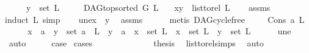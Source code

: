 \begin{isabellebody}
\ \ \ \ \ {\isachardoublequoteopen}y\ {\isasymin}\ set\ L{\isachardoublequoteclose}\isanewline
\ \ \ \ \ {\isachardoublequoteopen}DAG{\isachardot}{\kern0pt}top{\isacharunderscore}{\kern0pt}sorted\ G\ L{\isachardoublequoteclose}\isanewline
\ \ \ {\isachardoublequoteopen}{\isacharparenleft}{\kern0pt}x{\isacharcomma}{\kern0pt}y{\isacharparenright}{\kern0pt}\ {\isasymin}\ list{\isacharunderscore}{\kern0pt}to{\isacharunderscore}{\kern0pt}rel\ L{\isachardoublequoteclose}\isanewline
%
\isadelimproof
\ \ %
\endisadelimproof
%
\isatagproof
{}\isamarkupfalse%
\ assms\isanewline
{}\isamarkupfalse%
{\isacharparenleft}{\kern0pt}induct\ L{\isacharcomma}{\kern0pt}\ simp{\isacharparenright}{\kern0pt}\isanewline
\ \ \isamarkupfalse%
\ une{\isacharcolon}{\kern0pt}{\isachardoublequoteopen}x\ {\isasymnoteq}\ y{\isachardoublequoteclose}\ \isamarkupfalse%
\ assms\isanewline
\ \ \ \ \isamarkupfalse%
\ {\isacharparenleft}{\kern0pt}metis\ DAG{\isachardot}{\kern0pt}cycle{\isacharunderscore}{\kern0pt}free{\isacharparenright}{\kern0pt}\ \isanewline
\ \ \isamarkupfalse%
\ {\isacharparenleft}{\kern0pt}Cons\ a\ L{\isacharparenright}{\kern0pt}\isanewline
\ \ \isamarkupfalse%
\ \isamarkupfalse%
\ {\isachardoublequoteopen}x\ {\isacharequal}{\kern0pt}\ a\ {\isasymand}\ y\ {\isasymin}\ set\ {\isacharparenleft}{\kern0pt}a\ {\isacharhash}{\kern0pt}\ L{\isacharparenright}{\kern0pt}{\isachardoublequoteclose}\ {\isacharbar}{\kern0pt}\ {\isachardoublequoteopen}y\ {\isacharequal}{\kern0pt}\ a\ {\isasymand}\ x\ {\isasymin}\ set\ L{\isachardoublequoteclose}\ {\isacharbar}{\kern0pt}\ {\isachardoublequoteopen}x\ {\isasymin}\ set\ L\ {\isasymand}\ y\ {\isasymin}\ set\ L{\isachardoublequoteclose}\isanewline
\ \ \ \ \isamarkupfalse%
\ une\ \isamarkupfalse%
\ auto\isanewline
\ \ \isamarkupfalse%
\ \isamarkupfalse%
\ {\isacharquery}{\kern0pt}case\ \isamarkupfalse%
{\isacharparenleft}{\kern0pt}cases{\isacharparenright}{\kern0pt}\isanewline
\ \ \ \ \isamarkupfalse%
\ {}\isanewline
\ \ \ \ \isamarkupfalse%
\ \isamarkupfalse%
\ {\isacharquery}{\kern0pt}thesis\ \isamarkupfalse%
\ list{\isacharunderscore}{\kern0pt}to{\isacharunderscore}{\kern0pt}rel{\isachardot}{\kern0pt}simps\ \isamarkupfalse%
\ auto\isanewline
\ \ \isamarkupfalse%

\end{isabellebody}
